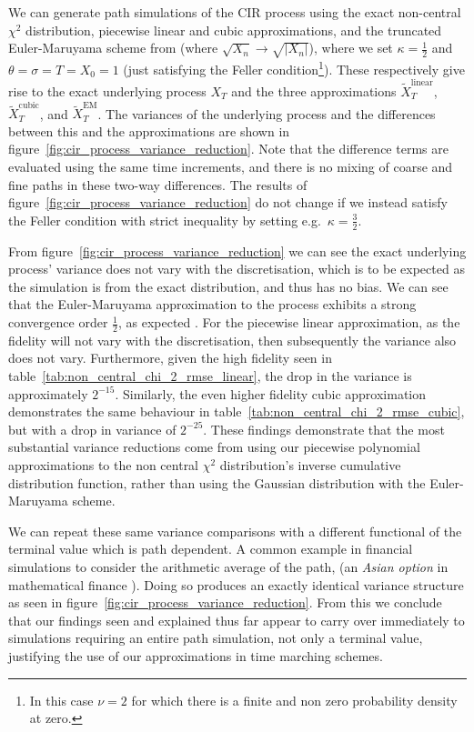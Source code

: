 \documentclass[9pt,a4paper,english]{extarticle}
\begin{document}
We can generate path simulations of the CIR process using the exact non-central $ \chi^2 $ distribution, piecewise linear and cubic approximations, and the truncated Euler-Maruyama scheme from \citet{higham2002strong} (where $ \sqrt{X_n} \to \sqrt{\lvert X_n \rvert} $), where we set $ \kappa= \tfrac{1}{2}$ and  $ \theta = \sigma =T = X_0 = 1 $ (just satisfying the Feller condition\footnote{In this case $ \nu = 2 $ for which there is a finite and non zero probability density at zero.}). These respectively give rise to the exact underlying process $ X_T $ and the three approximations $ \widetilde{X}^{\mathrm{linear}}_T $, $ \widetilde{X}^{\mathrm{cubic}}_T $, and 
$ \widetilde{X}^{\mathrm{EM}}_T $.
The variances of the underlying process and the differences between this and the approximations are shown in figure~\ref{fig:cir_process_variance_reduction}. Note that the difference terms are evaluated using the same time increments, and there is no mixing of coarse and fine paths in these two-way differences. The results of figure~\ref{fig:cir_process_variance_reduction} do not change if we instead satisfy the Feller condition with strict inequality by setting e.g.\ $ \kappa = \tfrac{3}{2} $.

From figure~\ref{fig:cir_process_variance_reduction} we can see the exact underlying process' variance does not vary with the discretisation, which is to be expected as the simulation is from the exact distribution, and thus has no bias. We can see that the Euler-Maruyama approximation to the process exhibits a strong convergence order $ \tfrac{1}{2} $, as expected \citep{higham2002strong,gyongy1998note}. For the piecewise linear approximation, as the fidelity will not vary with the discretisation, then subsequently the variance also does not vary. Furthermore, given the high fidelity seen in table~\ref{tab:non_central_chi_2_rmse_linear}, the drop in the variance is approximately $ 2^{-15} $. Similarly, the even higher fidelity cubic approximation demonstrates the same behaviour in table~\ref{tab:non_central_chi_2_rmse_cubic}, but with a drop in variance of $ 2^{-25} $. These findings demonstrate that the most substantial variance reductions come from using our piecewise polynomial approximations to the non central $ \chi^2 $ distribution's inverse cumulative distribution function, rather than using the Gaussian distribution with the Euler-Maruyama scheme. 

We can repeat these same variance comparisons with a different functional of the terminal value which is path dependent. A common example in financial simulations to consider the arithmetic average of the path, (an \textit{Asian option} in mathematical finance \citep{glasserman2013monte}). Doing so produces an exactly identical variance structure as seen in figure~\ref{fig:cir_process_variance_reduction}. From this we conclude that our findings seen and explained thus far appear to carry over immediately to simulations requiring an entire path simulation, not only a terminal value, justifying the use of our approximations in time marching schemes.
\end{document}
